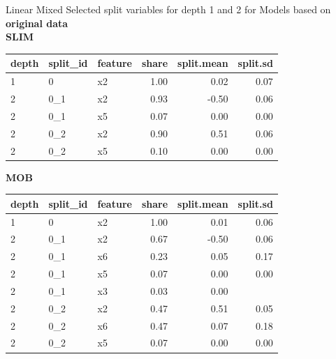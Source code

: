 \documentclass[9pt, xcolor=table]{beamer}
\begin{document}
\begin{frame}{Linear Mixed}
Selected split variables for depth 1 and 2 for Models based on \textbf{original data}\\
\textbf{SLIM}

\begin{table}[ht]
\centering
\begin{tabular}{lllrrr}
  \hline
depth & split\_id & feature & share & split.mean & split.sd \\ 
  \hline
1 & 0 & x2 & 1.00 & 0.02 & 0.07 \\ 
  2 & 0\_1 & x2 & 0.93 & -0.50 & 0.06 \\ 
  2 & 0\_1 & x5 & 0.07 & 0.00 & 0.00 \\ 
  2 & 0\_2 & x2 & 0.90 & 0.51 & 0.06 \\ 
  2 & 0\_2 & x5 & 0.10 & 0.00 & 0.00 \\ 
   \hline
\end{tabular}
\end{table}

\textbf{MOB}
\begin{table}[ht]
\centering
\begin{tabular}{lllrrr}
  \hline
depth & split\_id & feature & share & split.mean & split.sd \\ 
  \hline
1 & 0 & x2 & 1.00 & 0.01 & 0.06 \\ 
  2 & 0\_1 & x2 & 0.67 & -0.50 & 0.06 \\ 
  2 & 0\_1 & x6 & 0.23 & 0.05 & 0.17 \\ 
  2 & 0\_1 & x5 & 0.07 & 0.00 & 0.00 \\ 
  2 & 0\_1 & x3 & 0.03 & 0.00 &  \\ 
  2 & 0\_2 & x2 & 0.47 & 0.51 & 0.05 \\ 
  2 & 0\_2 & x6 & 0.47 & 0.07 & 0.18 \\ 
  2 & 0\_2 & x5 & 0.07 & 0.00 & 0.00 \\ 
   \hline
\end{tabular}
\end{table}

\end{frame}
\end{document}
